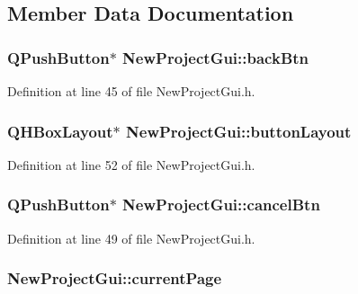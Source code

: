 \subsection{Member Data Documentation}
\hypertarget{class_new_project_gui_a9dd8fc63be73f0aa6f7c61349dff95a2}{
\subsubsection[{back\-Btn}]{\setlength{\rightskip}{0pt plus 5cm}Q\-Push\-Button$\ast$ New\-Project\-Gui\-::back\-Btn\hspace{0.3cm}{\ttfamily [private]}}}\label{class_new_project_gui_a9dd8fc63be73f0aa6f7c61349dff95a2}


Definition at line 45 of file New\-Project\-Gui.\-h.

\hypertarget{class_new_project_gui_a7281efc1048f02fae1610c1fa0925473}{
\subsubsection[{button\-Layout}]{\setlength{\rightskip}{0pt plus 5cm}Q\-H\-Box\-Layout$\ast$ New\-Project\-Gui\-::button\-Layout\hspace{0.3cm}{\ttfamily [private]}}}\label{class_new_project_gui_a7281efc1048f02fae1610c1fa0925473}


Definition at line 52 of file New\-Project\-Gui.\-h.

\hypertarget{class_new_project_gui_a91a081ae496b19cd64dd33b292b1761e}{
\subsubsection[{cancel\-Btn}]{\setlength{\rightskip}{0pt plus 5cm}Q\-Push\-Button$\ast$ New\-Project\-Gui\-::cancel\-Btn\hspace{0.3cm}{\ttfamily [private]}}}\label{class_new_project_gui_a91a081ae496b19cd64dd33b292b1761e}


Definition at line 49 of file New\-Project\-Gui.\-h.

\hypertarget{class_new_project_gui_ac1b0414d92030b3d545020fc889b1313}{
\subsubsection[{current\-Page}]{ New\-Project\-Gui\-::current\-Page\hspace{0.3cm}{\ttfamily [private]}}}\label{class_new_project_gui_ac1b0414d92030b3d545020fc889b1313}



